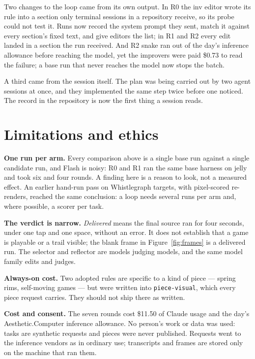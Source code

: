 \documentclass[10pt,letterpaper,twocolumn]{article}
\newcommand{\acdot}{{\color{acpink}.}}
\newcommand{\ac}{Aesthetic{\acdot}Computer}
\newcommand{\code}[1]{\texttt{#1}}
\begin{document}
Two changes to the loop came from its own output. In R0 the inv editor wrote
its rule into a section only terminal sessions in a repository receive, so its
probe could not test it. Runs now record the system prompt they sent, match it
against every section's fixed text, and give editors the list; in R1 and R2
every edit landed in a section the run received. And R2 snake ran out of the
day's inference allowance before reaching the model, yet the improvers were
paid \$0.73 to read the failure; a base run that never reaches the model now
stops the batch.

A third came from the session itself. The plan was being carried out by two
agent sessions at once, and they implemented the same step twice before one
noticed. The record in the repository is now the first thing a session reads.

\section{Limitations and ethics}
\label{sec:limits}

\textbf{One run per arm.} Every comparison above is a single base run against a
single candidate run, and Flash is noisy: R0 and R1 ran the same base harness on
jelly and took six and four rounds. A finding here is a reason to look, not a
measured effect. An earlier hand-run pass on Whistlegraph targets, with
pixel-scored re-renders, reached the same conclusion: a loop needs several runs
per arm and, where possible, a scorer per task.

\textbf{The verdict is narrow.} \emph{Delivered} means the final source ran for
four seconds, under one tap and one space, without an error. It does not
establish that a game is playable or a trail visible; the blank frame in
Figure~\ref{fig:frames} is a delivered run. The selector and reflector are
models judging models, and the same model family edits and judges.

\textbf{Always-on cost.} Two adopted rules are specific to a kind of piece ---
spring rims, self-moving games --- but were written into \code{piece-visual},
which every piece request carries. They should not ship there as written.

\textbf{Cost and consent.} The seven rounds cost \$11.50 of Claude usage and
the day's \ac{} inference allowance. No person's work or data was used: tasks
are synthetic requests and pieces were never published. Requests went to the
inference vendors as in ordinary use; transcripts and frames are stored only on
the machine that ran them.
\end{document}
